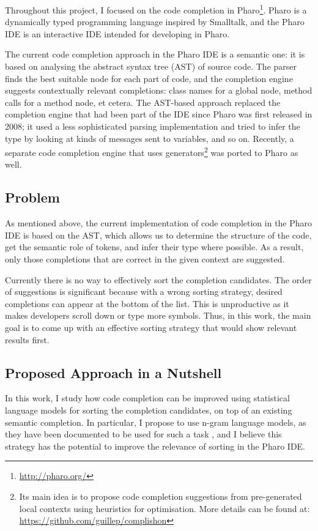 \documentclass[sigplan,screen]{acmart}
\begin{document}
Throughout this project, I focused on the code completion in Pharo\footnote{\url{http://pharo.org/}}. Pharo is a dynamically typed programming language inspired by Smalltalk, and the Pharo IDE is an interactive IDE intended for developing in Pharo.

The current code completion approach in the Pharo IDE is a semantic one: it is based on analysing the abstract syntax tree (AST) of source code. The parser finds the best suitable node for each part of code, and the completion engine suggests contextually relevant completions: class names for a global node, method calls for a method node, et cetera. The AST-based approach replaced the completion engine that had been part of the IDE since Pharo was first released in 2008; it used a less sophisticated parsing implementation and tried to infer the type by looking at kinds of messages sent to variables, and so on. Recently, a separate code completion engine that uses generators\footnote{Its main idea is to propose code completion suggestions from pre-generated local contexts using heuristics for optimisation. More details can be found at: \url{https://github.com/guillep/complishon}} was ported to Pharo as well.

\subsection{Problem}
As mentioned above, the current implementation of code completion in the Pharo IDE is based on the AST, which allows us to determine the structure of the code, get the semantic role of tokens, and infer their type where possible. As a result, only those completions that are correct in the given context are suggested.

Currently there is no way to effectively sort the completion candidates. The order of suggestions is significant because with a wrong sorting strategy, desired completions can appear at the bottom of the list. This is unproductive as it makes developers scroll down or type more symbols. Thus, in this work, the main goal is to come up with an effective sorting strategy that would show relevant results first. 

\subsection{Proposed Approach in a Nutshell}
In this work, I study how code completion can be improved using statistical language models for sorting the completion candidates, on top of an existing semantic completion. In particular, I propose to use n-gram language models, as they have been documented to be used for such a task \cite{Hind12a}, and I believe this strategy has the potential to improve the relevance of sorting in the Pharo IDE.
\end{document}
